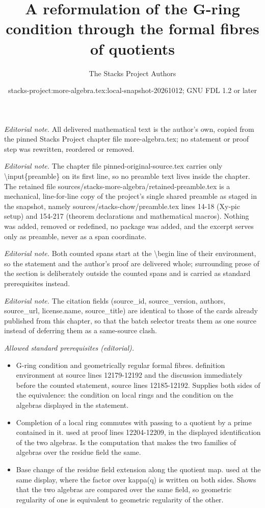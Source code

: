 \documentclass[10pt,a4paper]{amsart}
\title{A reformulation of the G-ring condition through the formal fibres of quotients}
\author{The Stacks Project Authors}
\date{stacks-project:more-algebra.tex:local-snapshot-20261012; GNU FDL 1.2 or later}
\theoremstyle{plain}
\theoremstyle{definition}
\theoremstyle{remark}
\numberwithin{equation}{subsection}
\begin{document}
\maketitle
\setcounter{subsection}{1}
\noindent\textit{Editorial note.} All delivered mathematical text is the author's own, copied from the pinned Stacks Project chapter file more-algebra.tex; no statement or proof step was rewritten, reordered or removed.\par\medskip
\noindent\textit{Editorial note.} The chapter file pinned-original-source.tex carries only \textbackslash{}input\{preamble\} on its first line, so no preamble text lives inside the chapter. The retained file sources/stacks-more-algebra/retained-preamble.tex is a mechanical, line-for-line copy of the project's single shared preamble as staged in the snapshot, namely sources/stacks-chow/preamble.tex lines 14-18 (Xy-pic setup) and 154-217 (theorem declarations and mathematical macros). Nothing was added, removed or redefined, no package was added, and the excerpt serves only as preamble, never as a span coordinate.\par\medskip
\noindent\textit{Editorial note.} Both counted spans start at the \textbackslash{}begin line of their environment, so the statement and the author's proof are delivered whole; surrounding prose of the section is deliberately outside the counted spans and is carried as standard prerequisites instead.\par\medskip
\noindent\textit{Editorial note.} The citation fields (source\_id, source\_version, authors, source\_url, license.name, source\_title) are identical to those of the cards already published from this chapter, so that the batch selector treats them as one source instead of deferring them as a same-source clash.\par\medskip
\noindent\textit{Allowed standard prerequisites (editorial).}\begin{itemize}
\item G-ring condition and geometrically regular formal fibres. definition environment at source lines 12179-12192 and the discussion immediately before the counted statement, source lines 12185-12192. Supplies both sides of the equivalence: the condition on local rings and the condition on the algebras displayed in the statement.
\item Completion of a local ring commutes with passing to a quotient by a prime contained in it. used at proof lines 12204-12209, in the displayed identification of the two algebras. Is the computation that makes the two families of algebras over the residue field the same.
\item Base change of the residue field extension along the quotient map. used at the same display, where the factor over kappa(q) is written on both sides. Shows that the two algebras are compared over the same field, so geometric regularity of one is equivalent to geometric regularity of the other.
\end{itemize}\medskip
\end{document}
